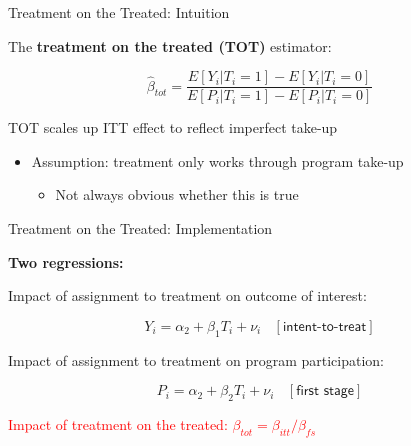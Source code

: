 \documentclass[10pt,xcolor=table,ignorenonframetext,aspectratio=169]{beamer}
\newlength{\wideitemsep}
\let\olditem\item
\renewcommand{\item}{\setlength{\itemsep}{\wideitemsep}\olditem}
\begin{document}
\begin{frame}{Treatment on the Treated:  Intuition}

\medskip
The \textbf{treatment on the treated (TOT)} estimator:

\medskip
\begin{small}
	\begin{equation*}
	\hat{\beta}_{tot} = \frac{E \left[ Y_i \vert T_i = 1 \right] - E \left[ Y_i \vert T_i = 0 \right]}{ 
		E \left[ P_i \vert T_i = 1 \right] - E \left[ P_i \vert T_i = 0 \right]}
	\end{equation*}
\end{small}

\medskip
TOT scales up ITT effect to reflect imperfect take-up

\medskip
\begin{itemize}
	
	\item Assumption:  treatment only works through program take-up
	
	\medskip
	\begin{itemize}
		
		\item Not always obvious whether this is true
		
	\end{itemize}
	
\end{itemize}

\end{frame}





\begin{frame}{Treatment on the Treated:  Implementation}

\medskip
\textbf{Two regressions:}

\medskip
Impact of assignment to treatment on outcome of interest:
\begin{small}
	\begin{equation*}
	Y_i = \alpha_2 + \beta_1 T_i + \nu_i \ \ \ \ [\textsf{intent-to-treat}]
	\end{equation*}
\end{small}

Impact of assignment to treatment on program participation:
\begin{small}
	\begin{equation*}
	P_i = \alpha_2 + \beta_2 T_i + \nu_i \ \ \ \ [\textsf{first stage}]
	\end{equation*}
\end{small}

\pause
\textcolor{red}{Impact of treatment on the treated:  $\beta_{tot} = \beta_{itt} / \beta_{fs}$}


\end{frame}
\end{document}
